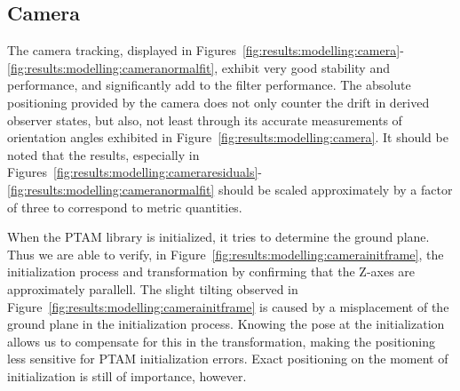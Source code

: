     \subsection{Camera}
        The camera tracking, displayed in Figures~\ref{fig:results:modelling:camera}-\ref{fig:results:modelling:cameranormalfit},
        exhibit very good stability and performance, and significantly add to
        the filter performance. The absolute positioning provided by the
        camera does not only counter the drift in derived observer states,
        but also, not least through its accurate measurements of orientation
        angles exhibited in Figure~\ref{fig:results:modelling:camera}.
        It should be noted that the results, especially in
        Figures~\ref{fig:results:modelling:cameraresiduals}-\ref{fig:results:modelling:cameranormalfit}
        should be scaled approximately by a factor of three to correspond
        to metric quantities.

        When the PTAM library is initialized, it tries to determine the
        ground plane. Thus we are able to verify, in Figure~\ref{fig:results:modelling:camerainitframe}, the initialization process and transformation
        by confirming that the Z-axes are approximately parallell.
        The slight tilting observed in Figure~\ref{fig:results:modelling:camerainitframe}
        is caused by a misplacement of the ground plane in the initialization process.
        Knowing the pose at the initialization allows us to compensate for this in the
        transformation, making the positioning less sensitive for PTAM initialization errors.
        Exact positioning on the moment of initialization is still of importance, however.


